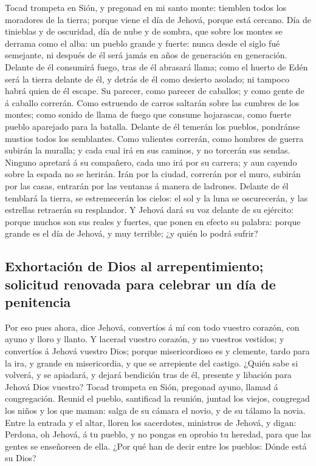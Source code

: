  Tocad trompeta en Sión, y pregonad en mi santo monte:
tiemblen todos los moradores de la tierra; porque viene el día de
Jehová, porque está cercano.  Día de tinieblas y de
oscuridad, día de nube y de sombra, que sobre los montes se derrama como
el alba: un pueblo grande y fuerte: nunca desde el siglo fué semejante,
ni después de él será jamás en años de generación en generación.
 Delante de él consumirá fuego, tras de él abrasará llama;
como el huerto de Edén será la tierra delante de él, y detrás de él como
desierto asolado; ni tampoco habrá quien de él escape.  Su
parecer, como parecer de caballos; y como gente de á caballo correrán.
 Como estruendo de carros saltarán sobre las cumbres de
los montes; como sonido de llama de fuego que consume hojarascas, como
fuerte pueblo aparejado para la batalla.  Delante de él
temerán los pueblos, pondránse mustios todos los semblantes.
 Como valientes correrán, como hombres de guerra subirán
la muralla; y cada cual irá en sus caminos, y no torcerán sus sendas.
 Ninguno apretará á su compañero, cada uno irá por su
carrera; y aun cayendo sobre la espada no se herirán. 
Irán por la ciudad, correrán por el muro, subirán por las casas,
entrarán por las ventanas á manera de ladrones.  Delante
de él temblará la tierra, se estremecerán los cielos: el sol y la luna
se oscurecerán, y las estrellas retraerán su resplandor. 
Y Jehová dará su voz delante de su ejército: porque muchos son sus
reales y fuertes, que ponen en efecto su palabra: porque grande es el
día de Jehová, y muy terrible; ¿y quién lo podrá sufrir?

\hypertarget{exhortaciuxf3n-de-dios-al-arrepentimiento-solicitud-renovada-para-celebrar-un-duxeda-de-penitencia}{%
\subsection{Exhortación de Dios al arrepentimiento; solicitud renovada
para celebrar un día de
penitencia}\label{exhortaciuxf3n-de-dios-al-arrepentimiento-solicitud-renovada-para-celebrar-un-duxeda-de-penitencia}}

 Por eso pues ahora, dice Jehová, convertíos á mí con
todo vuestro corazón, con ayuno y lloro y llanto.  Y
lacerad vuestro corazón, y no vuestros vestidos; y convertíos á Jehová
vuestro Dios; porque misericordioso es y clemente, tardo para la ira, y
grande en misericordia, y que se arrepiente del castigo. 
¿Quién sabe si volverá, y se apiadará, y dejará bendición tras de él,
presente y libación para Jehová Dios vuestro?  Tocad
trompeta en Sión, pregonad ayuno, llamad á congregación. 
Reunid el pueblo, santificad la reunión, juntad los viejos, congregad
los niños y los que maman: salga de su cámara el novio, y de su tálamo
la novia.  Entre la entrada y el altar, lloren los
sacerdotes, ministros de Jehová, y digan: Perdona, oh Jehová, á tu
pueblo, y no pongas en oprobio tu heredad, para que las gentes se
enseñoreen de ella. ¿Por qué han de decir entre los pueblos: Dónde está
su Dios?

